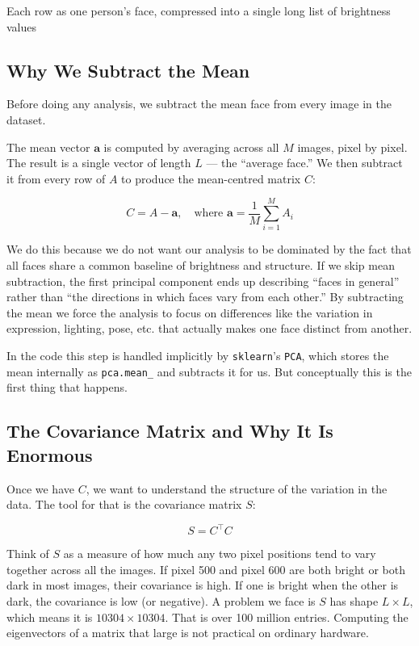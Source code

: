 \documentclass[12pt,a4paper]{article}
\begin{document}
Each row as one person's face, compressed into a single long list of
brightness values

\newpage
{}
\subsection{Why We Subtract the Mean}

Before doing any analysis, we
subtract the mean face from every image in the dataset.

The mean vector $\mathbf{a}$ is computed by averaging across all $M$ images,
pixel by pixel. The result is a single vector of length $L$ --- the
``average face.'' We then subtract it from every row of $A$ to produce the
mean-centred matrix $C$:

\[
C = A - \mathbf{a}, \quad \text{where } \mathbf{a} = \frac{1}{M}\sum_{i=1}^{M} A_i
\]

We do this because we do not want our analysis to be dominated by the fact
that all faces share a common baseline of brightness and structure. If we skip
mean subtraction, the first principal component ends up describing ``faces in
general'' rather than ``the directions in which faces vary from each other.''
By subtracting the mean we force the analysis to focus on differences like the
variation in expression, lighting, pose, etc. that actually makes one
face distinct from another.

In the code this step is handled implicitly by \texttt{sklearn}'s
\texttt{PCA}, which stores the mean internally as \texttt{pca.mean\_} and
subtracts it for us. But conceptually this is the first thing that happens.

\subsection{The Covariance Matrix and Why It Is Enormous}

Once we have $C$, we want to understand the structure of the variation in the
data. The tool for that is the covariance matrix $S$:

\[
S = C^{\top} C
\]

Think of $S$ as a measure of how much any two pixel positions tend to vary
together across all the images. If pixel 500 and pixel 600 are both bright or
both dark in most images, their covariance is high. If one is bright when the
other is dark, the covariance is low (or negative). A problem we face is $S$ has shape $L \times L$, which means it is $10304 \times 10304$.
That is over 100 million entries. Computing the eigenvectors of a matrix that
large is not practical on ordinary hardware.
\end{document}
